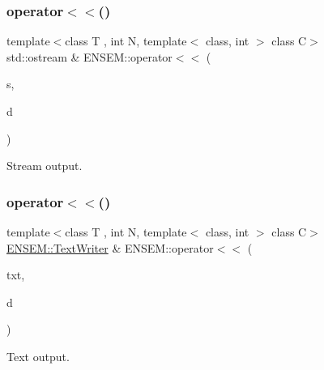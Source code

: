 \subsubsection{\texorpdfstring{operator$<$$<$()}{operator<<()}\hspace{0.1cm}{\footnotesize\ttfamily [1/3]}}
{\footnotesize\ttfamily template$<$class T , int N, template$<$ class, int $>$ class C$>$ \\
std\+::ostream \& E\+N\+S\+E\+M\+::operator$<$$<$ (\begin{DoxyParamCaption}\item[{std\+::ostream \&}]{s,  }\item[{const \mbox{\hyperlink{classENSEM_1_1PVector}{P\+Vector}}$<$ T, \mbox{\hyperlink{operator__name__util_8cc_a7722c8ecbb62d99aee7ce68b1752f337}{N}}, C $>$ \&}]{d }\end{DoxyParamCaption})\hspace{0.3cm}{\ttfamily [inline]}}



Stream output. 

\mbox{\label{group__primvector_gad4763d04d040319fe22a95ca0e2b8932}} 
\subsubsection{\texorpdfstring{operator$<$$<$()}{operator<<()}\hspace{0.1cm}{\footnotesize\ttfamily [2/3]}}
{\footnotesize\ttfamily template$<$class T , int N, template$<$ class, int $>$ class C$>$ \\
\mbox{\hyperlink{classENSEM_1_1TextWriter}{E\+N\+S\+E\+M\+::\+Text\+Writer}} \& E\+N\+S\+E\+M\+::operator$<$$<$ (\begin{DoxyParamCaption}\item[{\mbox{\hyperlink{classENSEM_1_1TextWriter}{E\+N\+S\+E\+M\+::\+Text\+Writer}} \&}]{txt,  }\item[{const \mbox{\hyperlink{classENSEM_1_1PVector}{P\+Vector}}$<$ T, \mbox{\hyperlink{operator__name__util_8cc_a7722c8ecbb62d99aee7ce68b1752f337}{N}}, C $>$ \&}]{d }\end{DoxyParamCaption})\hspace{0.3cm}{\ttfamily [inline]}}



Text output. 

